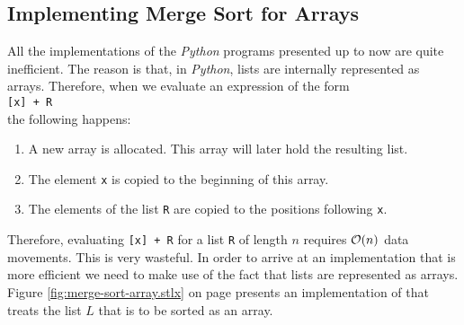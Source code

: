 \subsection{Implementing Merge Sort for Arrays}
All the implementations of the \textsl{Python} programs presented up to now are quite inefficient.  The
reason is that, in \textsl{Python}, lists are internally represented as arrays.  Therefore, when
we evaluate an expression of the form 
\\[0.2cm]
\hspace*{1.3cm}
\texttt{[x] + R}
\\[0.2cm]
the following happens:
\begin{enumerate}
\item A new array is allocated.  This array will later hold the resulting list.
\item The element \texttt{x} is copied to the beginning of this array.
\item The elements of the list \texttt{R} are copied to the positions following \texttt{x}.
\end{enumerate}
Therefore, evaluating \texttt{[x] + R} for a list \texttt{R} of length $n$ requires $\mathcal{O}(n)$ data
movements.  This is very wasteful.  In order to arrive at an
implementation that is more efficient we need to make use of the fact that lists are represented as arrays.
Figure \ref{fig:merge-sort-array.stlx} on page \pageref{fig:merge-sort-array.stlx} presents
an implementation of  that treats the list $L$ that is to be sorted as an array.


